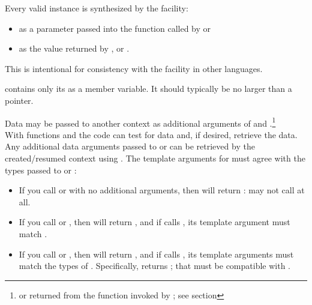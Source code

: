 \newpage
{}\label{design}


Every valid \cont instance is synthesized by the \callcc facility:
\begin{itemize}
\item as a parameter passed into the function called by \callcc or \resumewith
\item as the value returned by \callcc, \resume or \resumewith.
\end{itemize}

This is intentional for consistency with the \cc facility in other
languages.\cite{schemecallcc}\citecomma\cite{rubycallcc}


\cont contains only its  as a member variable. It should
typically be no larger than a pointer.

\label{subsec:data}

Data may be passed to another context as additional arguments of \callcc and
\resume.\footnote{or returned from the function invoked by \resumewith; see
section }\\

With functions \dataavail and \getdata the code can test for data and, if desired,
retrieve the data.\\

Any additional data arguments passed to \callcc or \resume can be retrieved by
the created/resumed context using \getdata. The template arguments
for \getdata must agree with the types passed to \callcc or \resume:

\begin{itemize}
  \item If you call  or \resume with no additional arguments,
  then \dataavail will return :  may not call \getdata at
  all.
  \item If you call 
  or , then \dataavail will return , and
  if  calls \getdata, its template argument must
  match .
  \item If you call 
  or , then \dataavail will return ,
  and if  calls \getdata, its template arguments must match the
  types of . Specifically, 
  returns ; that  must be compatible
  with .
\end{itemize}

